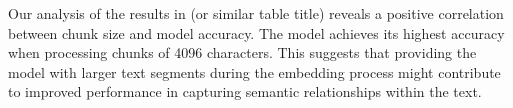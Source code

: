 Our analysis of the results in  (or similar table title) reveals a positive correlation between chunk size and model accuracy.
The model achieves its highest accuracy when processing chunks of 4096 characters.
This suggests that providing the model with larger text segments during the embedding process might contribute to improved performance in capturing semantic relationships within the text.


